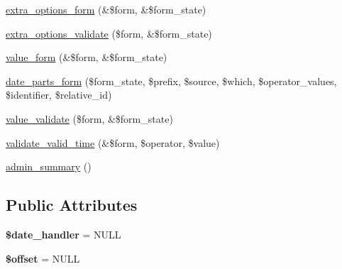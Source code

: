 \begin{DoxyCompactItemize}
\item 
\hyperlink{classdate__views__filter__handler__simple_aec14000e6f8d47bbb7c3dd0138a10c59}{extra\_\-options\_\-form} (\&\$form, \&\$form\_\-state)
\item 
\hyperlink{classdate__views__filter__handler__simple_a3b294398f9130f76fbf3144bf2120a63}{extra\_\-options\_\-validate} (\$form, \&\$form\_\-state)
\item 
\hyperlink{classdate__views__filter__handler__simple_a59232ef0a63cc9cf0a4a702ea6b06f12}{value\_\-form} (\&\$form, \&\$form\_\-state)
\item 
\hyperlink{classdate__views__filter__handler__simple_acdc710e1ffd67920b04e73804553998a}{date\_\-parts\_\-form} (\$form\_\-state, \$prefix, \$source, \$which, \$operator\_\-values, \$identifier, \$relative\_\-id)
\item 
\hyperlink{classdate__views__filter__handler__simple_ae3ced9cf12ef2a13e687f28a64b218f5}{value\_\-validate} (\$form, \&\$form\_\-state)
\item 
\hyperlink{classdate__views__filter__handler__simple_ac0a2fbc2f0984aab89796283d5b8c995}{validate\_\-valid\_\-time} (\&\$form, \$operator, \$value)
\item 
\hyperlink{classdate__views__filter__handler__simple_a0eb855c3f94765f6295868b81a27b9c3}{admin\_\-summary} ()
\end{DoxyCompactItemize}
\subsection*{Public Attributes}
\begin{DoxyCompactItemize}
\item 
\hypertarget{classdate__views__filter__handler__simple_a371d70b83a062c7fe056bac1325b1ae8}{
{\bfseries \$date\_\-handler} = NULL}
\label{classdate__views__filter__handler__simple_a371d70b83a062c7fe056bac1325b1ae8}

\item 
\hypertarget{classdate__views__filter__handler__simple_ad9bf1c39ede6ab8ac04c0e3e7d12a614}{
{\bfseries \$offset} = NULL}
\label{classdate__views__filter__handler__simple_ad9bf1c39ede6ab8ac04c0e3e7d12a614}

\end{DoxyCompactItemize}


